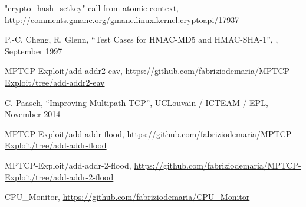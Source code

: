 \begin{thebibliography}{99}
"crypto\_hash\_setkey" call from atomic context, 
\url{http://comments.gmane.org/gmane.linux.kernel.cryptoapi/17937}

P.-C. Cheng, R. Glenn,
``Test Cases for HMAC-MD5 and HMAC-SHA-1'',
,  September 1997

MPTCP-Exploit/add-addr2-eav, 
\url{https://github.com/fabriziodemaria/MPTCP-Exploit/tree/add-addr2-eav}

C. Paasch,
``Improving Multipath TCP'',
UCLouvain / ICTEAM / EPL, November 2014

MPTCP-Exploit/add-addr-flood, 
\url{https://github.com/fabriziodemaria/MPTCP-Exploit/tree/add-addr-flood}

MPTCP-Exploit/add-addr-2-flood, 
\url{https://github.com/fabriziodemaria/MPTCP-Exploit/tree/add-addr-2-flood}

CPU\_Monitor, 
\url{https://github.com/fabriziodemaria/CPU_Monitor}

\end{thebibliography}
